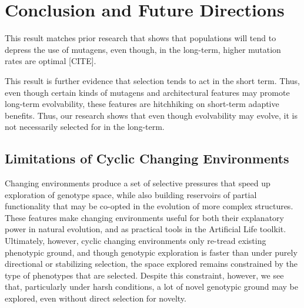 \documentclass[PhD]{msu-thesis}
\begin{document}







\chapter{Conclusion and Future Directions}
\label{chap:conclusion}

This result matches prior research that shows that populations will tend to depress the use of mutagens, even though, in the long-term, higher mutation rates are optimal [CITE].  

This result is further evidence that selection tends to act in the short term. Thus, even though certain kinds of mutagens and architectural features may promote long-term evolvability, these features are hitchhiking on short-term adaptive benefits. Thus, our research shows that even though evolvability may evolve, it is not necessarily selected for in the long-term. 


\section{Limitations of Cyclic Changing Environments}
Changing environments produce a set of selective pressures that speed up exploration of genotype space, while also building reservoirs of partial functionality that may be co-opted in the evolution of more complex structures. These features make changing environments useful for both their explanatory power in natural evolution, and as practical tools in the Artificial Life toolkit.
Ultimately, however, cyclic changing environments only re-tread existing phenotypic ground, and though genotypic exploration is faster than under purely directional or stabilizing selection, the space explored remains constrained by the type of phenotypes that are selected. Despite this constraint, however, we see that, particularly under harsh conditions, a lot of novel genotypic ground may be explored, even without direct selection for novelty. 
\end{document}
